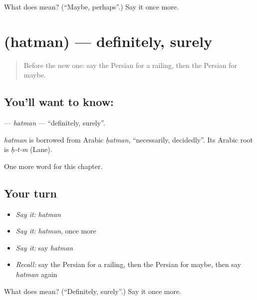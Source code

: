 \begin{tcolorbox}[breakable,colback=teal!4,colframe=teal!35!black,title={Before you move on}]
What does  mean? (\textquotedblleft{}Maybe, perhaps\textquotedblright{}.) Say it once more.
\end{tcolorbox}
\section[\texorpdfstring{\fa{حتما} (hatman)}{حتما (hatman)}]{ (hatman) — definitely, surely}

\label{lesson:FA-C233-hatman}



\begin{quote}
Before the new one: say the Persian for a railing, then the Persian for maybe.
\end{quote}

\subsection*{You'll want to know: }
\textbf{} — \emph{hatman} — \textquotedblleft{}definitely, surely\textquotedblright{}.

\begin{cousinweb}
\emph{hatman} is borrowed from Arabic \emph{ḥatman}, \textquotedblleft{}necessarily, decidedly\textquotedblright{}. Its Arabic root is \emph{ḥ-t-m} (Lane).
\end{cousinweb}

\begin{grammarlens}[title={What you've built}]
One more word for this chapter.
\end{grammarlens}

\subsection*{Your turn}
\begin{itemize}
\raggedright
  \item \emph{Say it:} \emph{hatman}
  \item \emph{Say it:} \emph{hatman}, once more
  \item \emph{Say it:} say \emph{hatman}
  \item \emph{Recall:} say the Persian for a railing, then the Persian for maybe, then say \emph{hatman} again
\end{itemize}

\begin{tcolorbox}[breakable,colback=teal!4,colframe=teal!35!black,title={Before you move on}]
What does  mean? (\textquotedblleft{}Definitely, surely\textquotedblright{}.) Say it once more.
\end{tcolorbox}
